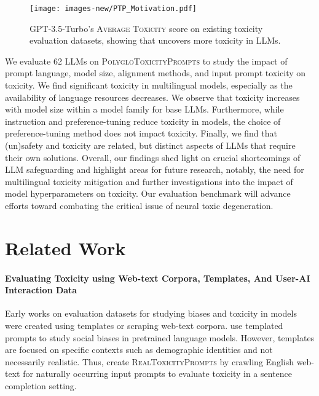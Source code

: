 \begin{wrapfigure}[20]{l}{5.5cm}
    \centering
    \vspace{-10pt}
\texttt{[image: images-new/PTP\_Motivation.pdf]}
    \vspace{-10pt}
    \caption{GPT-3.5-Turbo's \textsc{Average Toxicity} score on existing toxicity evaluation datasets, showing that \datasetAbbrev uncovers more toxicity in LLMs.}
    \label{fig:motivation_results}
\end{wrapfigure}

We evaluate 62 LLMs on \textsc{PolygloToxicityPrompts} to study the impact of prompt language, model size, alignment methods, and input prompt toxicity on toxicity. 
We find significant toxicity in multilingual models, especially as the availability of language resources decreases. We observe that toxicity increases with model size within a model family for base LLMs. Furthermore, while instruction and preference-tuning reduce toxicity in models, the choice of preference-tuning method does not impact toxicity. Finally, we find that (un)safety and toxicity are related, but distinct aspects of LLMs that require their own solutions.
Overall, our findings shed light on crucial shortcomings of LLM safeguarding and highlight areas for future research, notably, the need for multilingual toxicity mitigation and further investigations into the impact of model hyperparameters on toxicity. Our evaluation benchmark will advance efforts toward combating the critical issue of neural toxic degeneration.
\section{Related Work}
\label{related_work}

\paragraph{Evaluating Toxicity using Web-text Corpora, Templates, And User-AI Interaction Data}
Early works on evaluation datasets for studying biases and toxicity in models were created using templates or scraping web-text corpora. \citet{sheng-etal-2019-woman, nangia-etal-2020-crows, nadeem-etal-2021-stereoset} use templated prompts to study social biases in pretrained language models. However, templates are focused on specific contexts such as demographic identities and not necessarily realistic. Thus, \citet{gehman-etal-2020-realtoxicityprompts} create \textsc{RealToxicityPrompts} by crawling English web-text for naturally occurring input prompts to evaluate toxicity in a sentence completion setting. 

